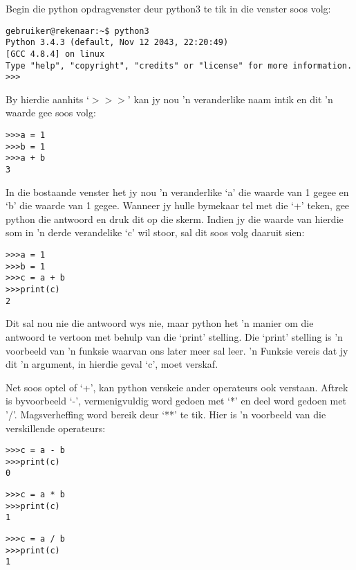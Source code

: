 Begin die python opdragvenster deur python3 te tik in die venster soos volg:

\begin{lstlisting}[style=DOS]
gebruiker@rekenaar:~$ python3
Python 3.4.3 (default, Nov 12 2043, 22:20:49) 
[GCC 4.8.4] on linux
Type "help", "copyright", "credits" or "license" for more information.
>>>
\end{lstlisting}

By hierdie aanhits `$>>>$' kan jy nou 'n veranderlike naam intik en dit 'n waarde gee soos volg:

\begin{lstlisting}[style=DOS]
>>>a = 1
>>>b = 1
>>>a + b
3
\end{lstlisting}

In die bostaande venster het jy nou 'n veranderlike `a' die waarde van 1 gegee en `b' die waarde van 1 gegee.  Wanneer jy hulle bymekaar tel met die `+' teken, gee python die antwoord en druk dit op die skerm.  Indien jy die waarde van hierdie som in 'n derde verandelike `c' wil stoor, sal dit soos volg daaruit sien:

\begin{lstlisting}[style=DOS]
>>>a = 1
>>>b = 1
>>>c = a + b
>>>print(c)
2
\end{lstlisting}

Dit sal nou nie die antwoord wys nie, maar python het 'n manier om die antwoord te vertoon met behulp van die `print' stelling.  Die `print' stelling is 'n voorbeeld van 'n funksie waarvan ons later meer sal leer.  'n Funksie vereis dat jy dit 'n argument, in hierdie geval `c', moet verskaf.

Net soos optel of `+', kan python verskeie ander operateurs ook verstaan.  Aftrek is byvoorbeeld `-', vermenigvuldig word gedoen met `*' en deel word gedoen met '/'.  Magsverheffing word bereik deur `**' te tik.  Hier is 'n voorbeeld van die verskillende operateurs:

\begin{lstlisting}[style=DOS]
>>>c = a - b
>>>print(c)
0
\end{lstlisting}


\begin{lstlisting}[style=DOS]
>>>c = a * b
>>>print(c)
1
\end{lstlisting}


\begin{lstlisting}[style=DOS]
>>>c = a / b
>>>print(c)
1
\end{lstlisting}


